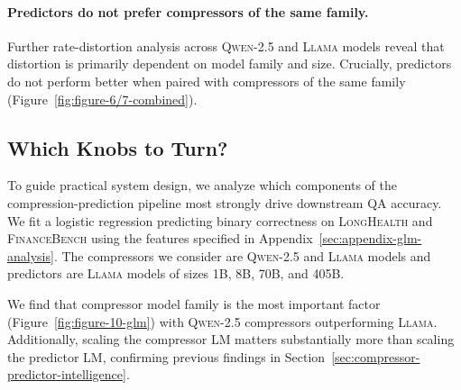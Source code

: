 \documentclass{article} %
\begin{document}
\paragraph*{Predictors do not prefer compressors of the same family.} 
Further rate-distortion analysis across \textsc{Qwen-2.5} and \textsc{Llama} models reveal that distortion is primarily dependent on model family and size. Crucially, predictors do not perform better when paired with compressors of the same family (Figure~\ref{fig:figure-6/7-combined}). 


\subsection{Which Knobs to Turn?}
\label{sec:glm-analysis}

To guide practical system design, we analyze which components of the compression-prediction pipeline most strongly drive downstream QA accuracy. We fit a logistic regression predicting binary correctness on \textsc{LongHealth} and \textsc{FinanceBench} using the features specified in Appendix~\ref{sec:appendix-glm-analysis}. The compressors we consider are \textsc{Qwen-2.5} and \textsc{Llama} models and predictors are \textsc{Llama} models of sizes 1B, 8B, 70B, and 405B.

We find that compressor model family is the most important factor (Figure~\ref{fig:figure-10-glm}) with \textsc{Qwen-2.5} compressors outperforming \textsc{Llama}. Additionally, scaling the compressor LM matters substantially more than scaling the predictor LM, confirming previous findings in Section~\ref{sec:compressor-predictor-intelligence}.
\end{document}
